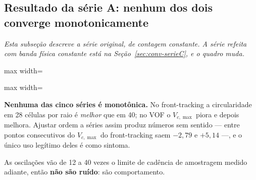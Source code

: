 \subsection{Resultado da s\'erie A: nenhum dos dois converge monotonicamente}
\label{sec:conv-serieA}

\emph{Esta subse\c{c}\~ao descreve a s\'erie original, de contagem constante. A
s\'erie refeita com banda f\'isica constante est\'a na
Se\c{c}\~ao~\ref{sec:conv-serieC}, e o quadro muda.}
\label{sec:conv-resultado}

\begin{adjustbox}{max width=\linewidth}
\end{adjustbox}

\begin{adjustbox}{max width=\linewidth}
\end{adjustbox}

\textbf{Nenhuma das cinco s\'eries \'e monot\^onica.} No front-tracking a
circularidade em 28 c\'elulas por raio \'e \emph{melhor} que em 40; no VOF o
$V_{c,\max}$ piora e depois melhora. Ajustar ordem a s\'eries assim produz
n\'umeros sem sentido --- entre pontos consecutivos do $V_{c,\max}$ do
front-tracking saem $-2{,}79$ e $+5{,}14$ ---, e o \'unico uso leg\'itimo deles \'e
como sintoma.

As oscila\c{c}\~oes v\~ao de 12 a 40 vezes o limite de cadência de amostragem
medido adiante, ent\~ao \textbf{n\~ao s\~ao ru\'ido}: s\~ao comportamento.

